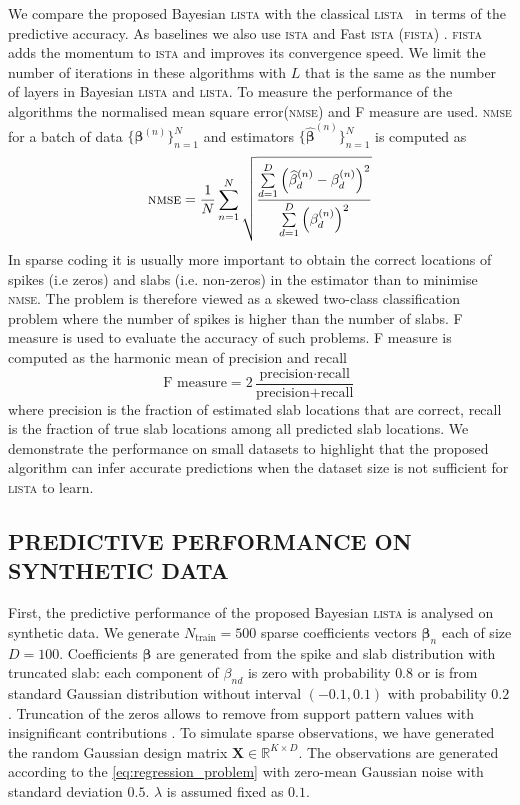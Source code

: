 \documentclass[letterpaper]{article}
\begin{document}
We compare the proposed Bayesian \textsc{lista} with the classical \textsc{lista}~\citep{gregor2010learning} in terms of the predictive accuracy. As baselines we also use \textsc{ista} \citep{daubechies2004iterative} and Fast \textsc{ista} (\textsc{fista}) \citep{beck2009fast}. \textsc{fista} adds the momentum to \textsc{ista} and improves its convergence speed. We limit the number of iterations in these algorithms with $L$ that is the same as the number of layers in Bayesian \textsc{lista} and \textsc{lista}. To measure the performance of the algorithms the normalised mean square error(\textsc{nmse}) and F measure are used. \textsc{nmse} for a batch of data $\{\boldsymbol\beta^{(n)}\}_{n=1}^{N}$ and estimators $\{\widehat{\boldsymbol\beta}^{(n)}\}_{n=1}^{N}$ is computed as
\begin{equation}
\text{\textsc{nmse}} = \frac{1}{N}\sum\limits_{n=1}^N\sqrt{\frac{\sum\limits_{d=1}^D\left(\widehat{\beta}_{d}^{(n)} - \beta_d^{(n)}\right)^2}{\sum\limits_{d=1}^D\left(\beta_{d}^{(n)}\right)^2}}
\end{equation}
In sparse coding it is usually more important to obtain the correct locations of spikes (i.e zeros) and slabs (i.e. non-zeros) in the estimator than to minimise \textsc{nmse}. The problem is therefore viewed as a skewed two-class classification problem where the number of spikes is higher than the number of slabs. F measure is used to evaluate the accuracy of such problems. 
F measure is computed as the harmonic mean of precision and recall
\begin{equation}
\text{F measure} = 2\dfrac{\text{precision}\cdot\text{recall}}{\text{precision} + \text{recall}}
\end{equation} 
where precision is the fraction of estimated slab locations that are correct, recall is the fraction of true slab locations among all predicted slab locations.
We demonstrate the performance on small datasets to highlight that the proposed algorithm can infer accurate predictions when the dataset size is not sufficient for \textsc{lista} to learn. 

\subsection{\uppercase{Predictive performance on synthetic data}}
First, the predictive performance of the proposed Bayesian \textsc{lista} is analysed on synthetic data. We generate $N_\text{train}=500$ sparse coefficients vectors $\boldsymbol\beta_n$ each of size $D = 100$. Coefficients $\boldsymbol\beta$ are generated from the spike and slab distribution with truncated slab: each component of $\beta_{nd}$ is zero with probability $0.8$ or is from standard Gaussian distribution without interval $(-0.1, 0.1)$ with probability $0.2$. Truncation of the zeros allows to remove from support pattern values with insignificant contributions \citep{xin2016maximal}. To simulate sparse observations, we have generated the random Gaussian design matrix $\mathbf{X} \in \mathbb{R}^{K \times D}$.  The observations are generated according to the \ref{eq:regression_problem} with zero-mean Gaussian noise with standard deviation $0.5$. $\lambda$ is assumed fixed as $0.1$.
\end{document}
